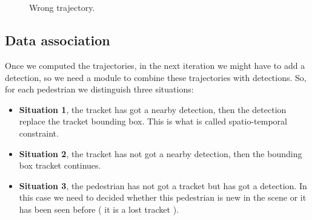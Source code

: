 \documentclass[12pt, a4paper, titlepage,twoside,openright]{article}
\begin{document}
\begin{figure}[H]
		
\centering

\\
\\
\caption{Wrong trajectory.}
\label{motion2nocoorrect}
\end{figure}





\subsection{Data association}


Once we computed the trajectories, in the next iteration we might have to add a detection, so we need a module to combine these trajectories with detections. So, for each pedestrian we distinguish three situations:

\begin{itemize}



\item \textbf{Situation 1}, the tracket has got a nearby detection, then the detection replace the tracket bounding box. This is what is called spatio-temporal constraint.

\item \textbf{Situation 2}, the tracket has not got a nearby detection, then the bounding box tracket continues.

\item \textbf{Situation 3}, the pedestrian has not got a tracket but has got a detection. In this case we need to decided whether this pedestrian is new in the scene or it has been seen before ( it is a lost tracket ).

\end{itemize}
\end{document}
